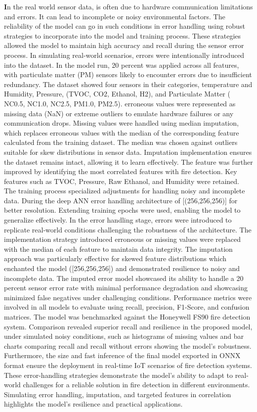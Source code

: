 \documentclass[conference]{IEEEtran}
\begin{document}
\textbf 
In the real world sensor data, is often due to hardware
communication limitations and errors. It can lead to
incomplete or noisy environmental factors. The reliability
of the model can go in such conditions in error handling
using robust strategies to incorporate into the model and
training process. These strategies allowed the model to
maintain high accuracy and recall during the sensor error
process. In simulating real-world scenarios, errors were
intentionally introduced into the dataset. In the model run,
20 percent was applied across all features, with particulate
matter (PM) sensors likely to encounter errors due to
insufficient redundancy. The dataset showed four sensors in
their categories, temperature and Humidity, Pressure, (TVOC,
CO2, Ethanol, H2), and Particulate Matter ( NC0.5, NC1.0,
NC2.5, PM1.0, PM2.5). erroneous values were represented as
missing data (NaN) or extreme outliers to emulate hardware
failures or any communication drops. Missing values were
handled using median imputation, which replaces erroneous
values with the median of the corresponding feature
calculated from the training dataset. The median was chosen
against outliers suitable for skew distributions in sensor
data. Imputation implementation ensures the dataset remains
intact, allowing it to learn effectively. The feature was
further improved by identifying the most correlated features
with fire detection. Key features such as TVOC, Pressure,
Raw Ethanol, and Humidity were retained.    
The training process specialized adjustments for handling
noisy and incomplete data. During the deep ANN error
handling architecture of [(256,256,256)] for better
resolution. Extending training epochs were used, enabling
the model to generalize effectively. In the error handling
stage, errors were introduced to replicate real-world
conditions challenging the robustness of the architecture.
The implementation strategy introduced erroneous or missing
values were replaced with the median of each feature to
maintain data integrity. The imputation approach was
particularly effective for skewed feature distributions
which enchanted the model ([256,256,256]) and demonstrated
resilience to noisy and incomplete data. The imputed error
model showcased its ability to handle a 20 percent sensor
error rate with minimal performance degradation and
showcasing minimized false negatives under challenging
conditions. Performance metrics were involved in all models
to evaluate using recall, precision, F1-Score, and confusion
matrices. The model was benchmarked against the Honeywell
FS90 fire detection system. Comparison revealed superior
recall and resilience in the proposed model, under simulated
noisy conditions, such as histograms of missing values and
bar charts comparing recall and recall without errors
showing the model's robustness. Furthermore, the size and
fast inference of the final model exported in ONNX format
ensure the deployment in real-time IoT scenarios of fire
detection systems. These error-handling strategies
demonstrate the model's ability to adapt to real-world
challenges for a reliable solution in fire detection in
different environments. Simulating error handling,
imputation, and targeted features in correlation highlights
the model's resilience and practical applications. 
\end{document}
